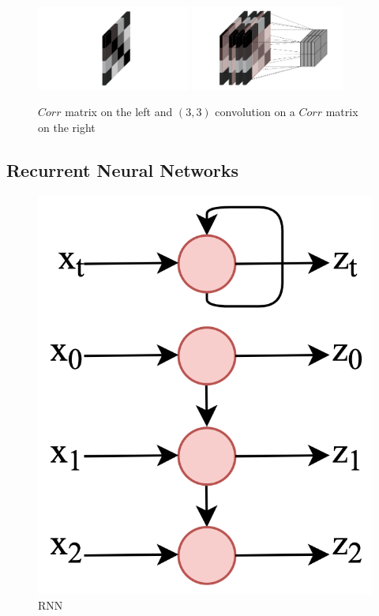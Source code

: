 \documentclass{article}
\begin{document}
\begin{figure}[H]
    \centering
{{\includegraphics[width=0.45\textwidth]{Plots/Corr.png} }}%
    \qquad
{{\includegraphics[width=0.45\textwidth]{Plots/Corr_v1.png} }}%
    \caption{$Corr$ matrix on the left and $(3,3)$ convolution on a $Corr$ matrix on the right}%
\end{figure}



\subsection{Recurrent Neural Networks}

\begin{figure}
\includegraphics[width=1\linewidth]{Plots/RNN2.png}
\caption{RNN}\label{wrap-fig:2}
\end{figure}
\end{document}
